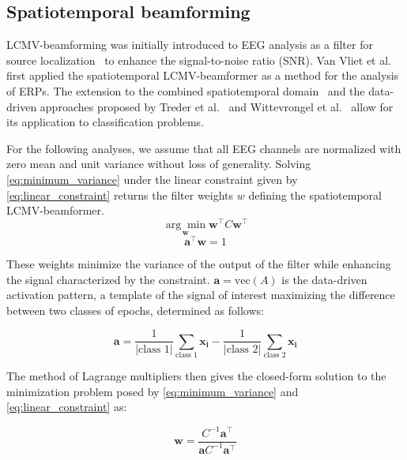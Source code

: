 	\subsection{Spatiotemporal beamforming}
	LCMV-beamforming was initially introduced to EEG analysis as a filter for
	source localization~\cite{VanVeen1997} to enhance the signal-to-noise ratio
	(SNR).
	Van Vliet et al.~\cite{VanVliet2015} first applied the spatiotemporal
	LCMV-beamformer as a method for the analysis of ERPs.
	The extension to the combined spatiotemporal domain~\cite{VanVliet2015} and the
	data-driven approaches proposed by Treder et al.~\cite{Treder2016} and
	Wittevrongel et al.~\cite{Wittevrongel2016} allow for its application to classification problems.

	For the following analyses, we assume that all EEG channels are normalized with zero mean and unit variance without loss of generality.
	Solving \autoref{eq:minimum_variance} under the linear constraint given by
	\autoref{eq:linear_constraint} returns the filter weights $w$ defining the spatiotemporal LCMV-beamformer.
	\begin{equation}
		\underset{\mathbf{w}}{\arg\min}\mathbf{w}^\intercal C
		\mathbf{w}^\intercal
		\label{eq:minimum_variance}
	\end{equation}
	\begin{equation}
		\mathbf{a}^\intercal\mathbf{w} = 1
		\label{eq:linear_constraint}
	\end{equation}

	These weights minimize the variance of the output of the filter while enhancing
	the signal characterized by the constraint.
	$\mathbf{a} = \text{vec}(A)$ is the data-driven activation pattern, a template
	of the signal of interest maximizing the difference between two classes of
	epochs, determined as follows:

	\begin{equation}
		\mathbf{a} =
		\frac{1}{|\text{class 1}|}\sum_\text{class 1}\mathbf{x_i} -
		\frac{1}{|\text{class 2}|}\sum_\text{class 2}\mathbf{x_i}
		\label{eq:activation_pattern}
	\end{equation}

	The method of Lagrange multipliers then gives the closed-form solution to the minimization problem posed by
	\autoref{eq:minimum_variance} and \autoref{eq:linear_constraint} as:

	\begin{equation}
		\mathbf{w} =
		\frac{C^{-1}\mathbf{a}^\intercal}
		{\mathbf{a}C^{-1}\mathbf{a}^\intercal}
		\label{eq:closed_form}
	\end{equation}



